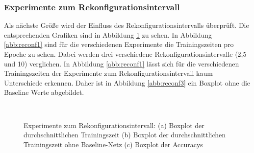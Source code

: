\subsubsection{Experimente zum Rekonfigurationsintervall}
 Als nächste Größe wird der Einfluss des Rekonfigurationsintervalls überprüft. Die entsprechenden Grafiken sind in Abbildung \ref{abb:reconf} zu sehen. In Abbildung \ref{abb:reconf1} sind für die verschiedenen Experimente die Trainingszeiten pro Epoche zu sehen. Dabei werden drei verschiedene Rekonfigurationsintervalle (2,5 und 10) verglichen. In Abbildung \ref{abb:reconf1} lässt sich für die verschiedenen Trainingszeiten der Experimente zum Rekonfigurationsintervall kaum Unterschiede erkennen. Daher ist in Abbildung \ref{abb:reconf3} ein Boxplot ohne die Baseline Werte abgebildet. 
 
 
\begin{figure}
     \centering
     \hfill
     \\
     \caption{Experimente zum Rekonfigurationsintervall: (a) Boxplot der durchschnittlichen Trainingszeit (b) Boxplot der durchschnittlichen Trainingszeit ohne Baseline-Netz (c) Boxplot der Accuracys}
     \label{abb:reconf}
\end{figure}

